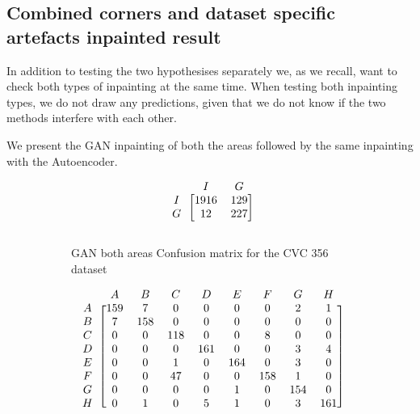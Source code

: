 \FloatBarrier
\subsection{Combined corners and dataset specific artefacts inpainted result}

In addition to testing the two hypothesises separately we, as we recall, want to check both types of inpainting at the same time.
When testing both inpainting types, we do not draw any predictions, given that we do not know if the two methods interfere with each other. 

We present the GAN inpainting of both the areas followed by the same inpainting with the Autoencoder.


\begin{figure}[h]
\myfontsize
\caption*{\footnotesize \textmd{ \textbf{A}:{dyed-lifted-polyps} , \textbf{B}:{dyed-resection-margins} , \textbf{C}:{esophagitis} , \textbf{D}:{normal-cecum} , \textbf{E}:{normal-pylorus} , \textbf{F}:{normal-z-line} , \textbf{G}:{polyps} , \textbf{H}:{ulcerative-colitis} , \textbf{I}:{non-polyp}}}

\begin{subfigure}[b]{0.25\textwidth}
     
\[
\begin{blockarray}{ccc}
& I & G  \\
\begin{block}{c[cc]}
        I&1916 &  129\\
        G& 12 &  227\\
\end{block}
\end{blockarray}
 \]         

\caption{GAN both areas Confusion matrix for the CVC 356 dataset}
\label{mat:cvc356_CM_DN121_GAN_BOTH}
\end{subfigure}
\begin{subfigure}[b]{0.49\textwidth}  
\scriptsize     
\[
\begin{blockarray}{ccccccccc}
& A & B & C & D & E & F & G & H \\
\begin{block}{c[cccccccc]}
A&159 & 7 & 0 & 0 & 0 & 0 & 2 & 1\\
B&  7 & 158 & 0 & 0 & 0 & 0 & 0 & 0\\
C&  0 & 0 & 118 & 0 & 0 & 8 & 0 & 0\\
D&  0 & 0 & 0 & 161 & 0 & 0 & 3 & 4\\
E&  0 & 0 & 1 & 0 & 164 & 0 & 3 & 0\\
F&  0 & 0 & 47 & 0 & 0 & 158 & 1 & 0\\
G&  0 & 0 & 0 & 0 & 1 & 0 & 154 & 0\\
H&  0 & 1 & 0 & 5 & 1 & 0 & 3 & 161\\
\end{block}
\end{blockarray}
 \]        
        

\end{subfigure}
\end{figure}
